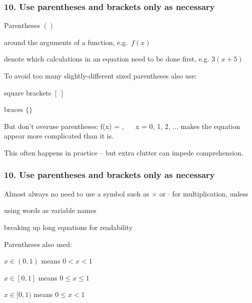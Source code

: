 
\begin{frame}
\frametitle{10. Use parentheses and brackets only as necessary}

Parentheses $()$
\bi
\item around the arguments of a function, e.g.~$f(x)$
\item denote which calculations in an equation need to be done first, e.g. $3 (x
  + 5)$
\ei

To avoid too many slightly-different sized parentheses also use:
\bi
\item square brackets $[~]$
\item braces $\{\}$
\ei

\pause

But don't overuse parentheses:
\eb
\nonumber f(x) = ,
  ~~ x = 0, 1, 2, ...
\ee
makes the equation appear more complicated than it is.

This often happens in practice -- but extra clutter can impede comprehension.

\end{frame}


\begin{frame}
\frametitle{10. Use parentheses and brackets only as necessary}

Almost always no need to use a symbol such as $\times$ or $\cdot$ for
multiplication, unless
\bi
\item using words as variable names
\item breaking up long equations for readability
\ei

\pause

Parentheses also used:
\bi
\item $x \in (0, 1)$ means $0 < x < 1$
\item $x \in [0, 1]$ means $0 \leq x \leq 1$
\item $x \in [0, 1)$ means $0 \leq x < 1$
\ei

\end{frame}


